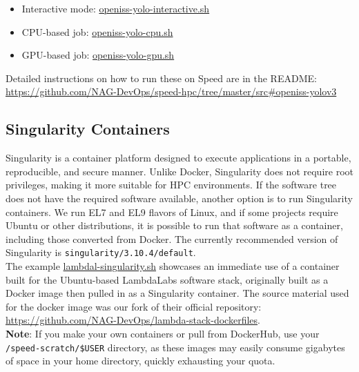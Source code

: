 \begin{itemize}
	\item Interactive mode:
  \href{https://github.com/NAG-DevOps/speed-hpc/blob/master/src/openiss-yolo-interactive.sh}
  {openiss-yolo-interactive.sh}
	\item CPU-based job:
  \href{https://github.com/NAG-DevOps/speed-hpc/blob/master/src/openiss-yolo-cpu.sh}
  {openiss-yolo-cpu.sh}
	\item GPU-based job:
  \href{https://github.com/NAG-DevOps/speed-hpc/blob/master/src/openiss-yolo-gpu.sh}
  {openiss-yolo-gpu.sh}
\end{itemize}

\noindent Detailed instructions on how to run these on Speed are in the README: 
\url{https://github.com/NAG-DevOps/speed-hpc/tree/master/src#openiss-yolov3}

\subsection{Singularity Containers}
\label{sect:singularity-containers}

Singularity is a container platform designed to execute applications in a portable, 
reproducible, and secure manner. Unlike Docker, Singularity does not require root privileges, 
making it more suitable for HPC environments. If the  software tree does not have 
the required software available, another option is to run Singularity containers. 
We run EL7 and EL9 flavors of Linux, and if some projects require Ubuntu or 
other distributions, it is possible to run that software as a container, 
including those converted from Docker. The currently recommended version of Singularity 
is \texttt{singularity/3.10.4/default}.\\

The example
\href{https://github.com/NAG-DevOps/speed-hpc/blob/master/src/lambdal-singularity.sh}{lambdal-singularity.sh}
showcases an immediate use of a container built for the Ubuntu-based LambdaLabs software stack, 
originally built as a Docker image then pulled in as a Singularity container. The source material
used for the docker image was our fork of their official repository: 
\url{https://github.com/NAG-DevOps/lambda-stack-dockerfiles}.\\

\noindent \textbf{Note}: If you make your own containers or pull from DockerHub,
use your \verb+/speed-scratch/$USER+ directory, as these images may easily 
consume gigabytes of space in your home directory, quickly exhausting your quota.\\

